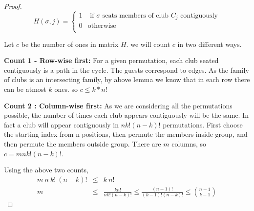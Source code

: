 \begin{theorem}
\begin{proof}
$$H(\sigma,j) = 
\begin{cases}
1 & \textrm{~if $\sigma$ seats members of club $C_j$ contiguously} \\
0 & \textrm{otherwise} \\
\end{cases}
$$

Let $c$ be the number of ones in matrix $H$. we will count $c$ in two different ways.

\begin{description}
\item{\textbf{Count 1 - Row-wise first:}} For a given permutation, each club seated contiguously is a path in the cycle. The guests correspond to edges. As the family of clubs is an intersecting family, by above lemma we know that in each row there can be atmost $k$ ones. so $c \le k*n!$
\item{\textbf{Count 2 : Column-wise first:}} As we are considering all the permutations possible, the number of times each club appears contiguously will be the same. In fact a club will appear contiguously in $nk!(n-k)!$ permutations. First choose the starting index from n positions, then permute the members inside group, and then permute the members outside group. There are $m$ columns, so $c=mnk!(n-k)!$.
\end{description}
Using the above two counts, 
\begin{eqnarray*}
m~n~k!~(n-k)! & \le & k~n! \\ 
m & \le & \frac{kn!}{nk!(n-k)!} \le \frac{(n-1)!}{(k-1)!(n-k)!} \le {n-1 \choose k-1}
\end{eqnarray*}


\end{proof}
\end{theorem}
